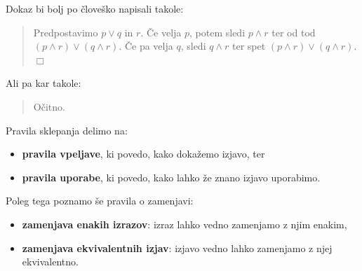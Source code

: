 \begin{center}
\end{center}
%
Dokaz bi bolj po človeško napisali takole:
%
\begin{quote}
  Predpostavimo $p \lor q$ in $r$. Če velja $p$, potem sledi $p \land r$ ter od tod $(p \land r) \lor (q \land r)$. Če pa velja $q$, sledi $q \land r$ ter spet $(p \land r) \lor (q \land r)$. $\Box$
\end{quote}
%
Ali pa kar takole:
%
\begin{quote}
  Očitno.
\end{quote}

Pravila sklepanja delimo na:
%
\begin{itemize}
\item \textbf{pravila vpeljave}, ki povedo, kako dokažemo izjavo, ter
\item \textbf{pravila uporabe}, ki povedo, kako lahko že znano izjavo uporabimo.
\end{itemize}
%
Poleg tega poznamo še pravila o zamenjavi:
%
\begin{itemize}
\item \textbf{zamenjava enakih izrazov}: izraz lahko vedno zamenjamo z njim enakim,
\item \textbf{zamenjava ekvivalentnih izjav}: izjavo vedno lahko zamenjamo z njej ekvivalentno.
\end{itemize}


